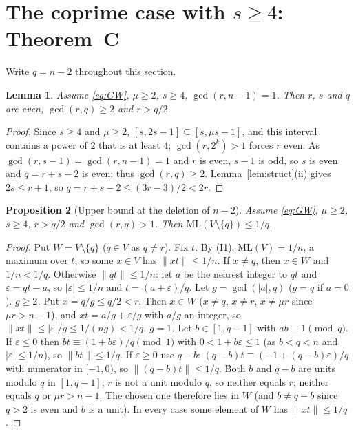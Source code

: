 \documentclass[11pt]{article}
\newtheorem{lemma}{Lemma}
\newtheorem{proposition}[lemma]{Proposition}
\theoremstyle{remark}
\newcommand{\norm}[1]{\lVert #1\rVert}
\newcommand{\ML}{\mathrm{ML}}
\begin{document}
\section{\texorpdfstring{The coprime case with $s\ge4$: Theorem~C}{The coprime case with s>=4: Theorem C}}\label{sec:C}

Write $q=n-2$ throughout this section.

\begin{lemma}\label{lem:coprime}
Assume \eqref{eq:GW}, $\mu\ge2$, $s\ge4$, $\gcd(r,n-1)=1$. Then $r$, $s$ and $q$ are even, $\gcd(r,q)\ge2$ and $r>q/2$.
\end{lemma}
\begin{proof}
Since $s\ge4$ and $\mu\ge2$, $[s,2s-1]\subseteq[s,\mu s-1]$, and this interval contains a power of $2$ that is at least $4$; $\gcd(r,2^k)>1$ forces $r$ even. As $\gcd(r,s-1)=\gcd(r,n-1)=1$ and $r$ is even, $s-1$ is odd, so $s$ is even and $q=r+s-2$ is even; thus $\gcd(r,q)\ge2$. Lemma~\ref{lem:struct}(ii) gives $2s\le r+1$, so $q=r+s-2\le(3r-3)/2<2r$.
\end{proof}

\begin{proposition}[Upper bound at the deletion of $n-2$]\label{prop:ub2}
Assume \eqref{eq:GW}, $\mu\ge2$, $s\ge4$, $r>q/2$ and $\gcd(r,q)>1$. Then $\ML(V\setminus\{q\})\le1/q$.
\end{proposition}
\begin{proof}
Put $W=V\setminus\{q\}$ ($q\in V$ as $q\ne r$). Fix $t$. By (I1), $\ML(V)=1/n$, a maximum over $t$, so some $x\in V$ has $\norm{xt}\le1/n$. If $x\ne q$, then $x\in W$ and $1/n<1/q$. Otherwise $\norm{qt}\le1/n$: let $a$ be the nearest integer to $qt$ and $\varepsilon=qt-a$, so $|\varepsilon|\le1/n$ and $t=(a+\varepsilon)/q$. Let $g=\gcd(|a|,q)$ ($g=q$ if $a=0$).
\emph{$g\ge2$.} Put $x=q/g\le q/2<r$. Then $x\in W$ ($x\ne q$, $x\ne r$, $x\ne\mu r$ since $\mu r>n-1$), and $xt=a/g+\varepsilon/g$ with $a/g$ an integer, so $\norm{xt}\le|\varepsilon|/g\le1/(ng)<1/q$.
\emph{$g=1$.} Let $b\in[1,q-1]$ with $ab\equiv1\pmod q$. If $\varepsilon\le0$ then $bt\equiv(1+b\varepsilon)/q\pmod1$ with $0<1+b\varepsilon\le1$ (as $b<q<n$ and $|\varepsilon|\le1/n$), so $\norm{bt}\le1/q$. If $\varepsilon\ge0$ use $q-b$: $(q-b)t\equiv(-1+(q-b)\varepsilon)/q$ with numerator in $[-1,0)$, so $\norm{(q-b)t}\le1/q$. Both $b$ and $q-b$ are units modulo $q$ in $[1,q-1]$; $r$ is not a unit modulo $q$, so neither equals $r$; neither equals $q$ or $\mu r>n-1$. The chosen one therefore lies in $W$ (and $b\ne q-b$ since $q>2$ is even and $b$ is a unit).
In every case some element of $W$ has $\norm{xt}\le1/q$.
\end{proof}
\end{document}
